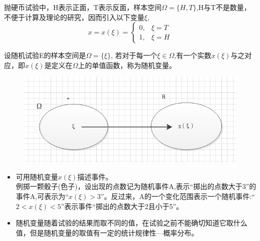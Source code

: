 \documentclass[xcolor=svgnames,serif,table,10pt]{beamer}
\begin{document}
\begin{frame}
\begin{example}
	抛硬币试验中，H表示正面，T表示反面，样本空间$\Omega=\{H,T\}$,H与T不是数量，不便于计算及理论的研究，因而引入以下变量$\xi$,
	$$x=x(\xi)=
	\begin{cases}
	0, &\xi=T\\
	1, &\xi=H
	\end{cases}
	$$
\end{example}  
\end{frame}

\begin{frame}
\begin{definition}
设随机试验E的样本空间是$\Omega=\{\xi\}$, 若对于每一个$\xi\in\Omega$,有一个实数$x(\xi)$与之对应，即$x(\xi)$是定义在$\Omega$上的单值函数，称为随机变量。
\end{definition}
\begin{figure}[htbp]
\includegraphics[scale=0.3]{xi_map}
\end{figure}
\begin{itemize}
\item 可用随机变量$x(\xi)$描述事件。\\
例掷一颗骰子(色子)，设出现的点数记为随机事件A,表示``掷出的点数大于3''的事件A,可表示为``$x(\xi)>3$''。反过来，A的一个变化范围表示一个随机事件:``$2<x(\xi)<5$''表示事件``掷出的点数大于2且小于5''。
\item 随机变量随着试验的结果而取不同的值，在试验之前不能确切知道它取什么值，但是随机变量的取值有一定的统计规律性---概率分布。
\end{itemize}
\end{frame}
\end{document}
